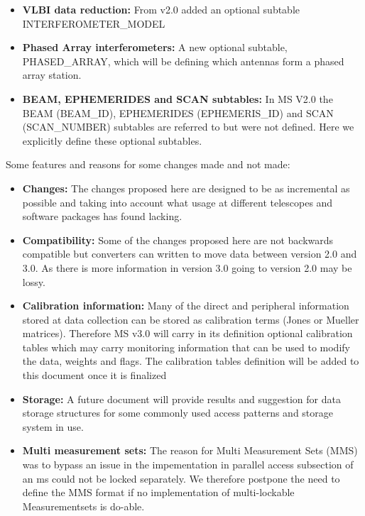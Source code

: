 \documentclass{article}
\begin{document}
\begin{itemize}
\item{{\bf VLBI data reduction:} From v2.0 added an optional subtable
    INTERFEROMETER\_MODEL}

\item{{\bf Phased Array interferometers:} A new optional subtable,
    PHASED\_ARRAY, which will be defining which antennas form a phased
    array station.}

\item{{\bf BEAM, EPHEMERIDES and SCAN subtables:} In MS V2.0 the BEAM
  (BEAM\_ID), EPHEMERIDES (EPHEMERIS\_ID) and SCAN (SCAN\_NUMBER)
  subtables are referred to but were not defined. Here we explicitly
  define these optional subtables.}


\end{itemize}



Some features and reasons for some changes made and not made:

\begin{itemize}

\item{{\bf Changes:} The changes proposed here are designed
  to be as incremental as possible and taking into account what usage
  at different telescopes and software packages has found lacking.}

\item{{\bf Compatibility:} Some of the changes proposed here are not
  backwards compatible but converters can written to move data between
  version 2.0 and 3.0. As there is more information in version 3.0
  going to version 2.0 may be lossy.}

\item{{\bf Calibration information:} Many of the direct and peripheral
  information stored at data collection can be stored as calibration
  terms (Jones or Mueller matrices). Therefore MS v3.0 will carry in
  its definition optional calibration tables which may carry
  monitoring information that can be used to modify the data, weights
  and flags. The calibration tables definition will be added to this
  document once it is finalized }

\item{{\bf Storage:} A future document will provide results and
    suggestion for data storage structures for some commonly used
    access patterns and storage system in use.}

\item{{\bf Multi measurement sets:} The reason for Multi Measurement
  Sets (MMS) was to bypass an issue in the impementation in parallel
  access subsection of an ms could not be locked separately. We
  therefore postpone the need to define the MMS format if no
  implementation of multi-lockable Measurementsets is do-able. }


\end{itemize}
\end{document}
